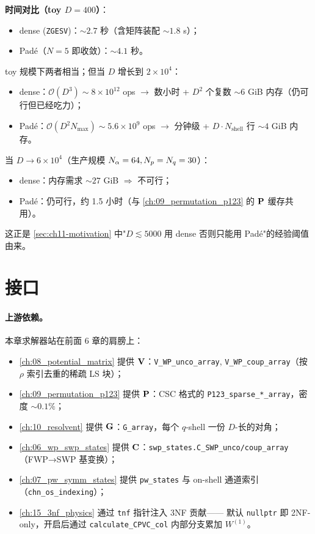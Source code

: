 \begin{numericalbox}
\medskip
\textbf{时间对比（toy \(D=400\)）}：
\begin{itemize}
  \item dense (\texttt{ZGESV})：\(\sim 2.7\) 秒（含矩阵装配 \(\sim 1.8\) s）；
  \item Padé（\(N=5\) 即收敛）：\(\sim 4.1\) 秒。
\end{itemize}
toy 规模下两者相当；但当 \(D\) 增长到 \(2 \times 10^4\)：
\begin{itemize}
  \item dense：\(\mathcal{O}(D^3) \sim 8 \times 10^{12}\) ops \(\to\) 数小时
        + \(D^2\) 个复数 \(\sim\!6\) GiB 内存（仍可行但已经吃力）；
  \item Padé：\(\mathcal{O}(D^2 N_{\max}) \sim 5.6 \times 10^9\) ops \(\to\) 分钟级
        + \(D \cdot N_{\text{shell}}\) 行 \(\sim\!4\) GiB 内存。
\end{itemize}
当 \(D \to 6 \times 10^4\)（生产规模 \(N_\alpha=64, N_p=N_q=30\)）：
\begin{itemize}
  \item dense：内存需求 \(\sim 27\) GiB \(\Rightarrow\) 不可行；
  \item Padé：仍可行，约 1.5 小时（与 \cref{ch:09_permutation_p123} 的 \(\mathbf{P}\) 缓存共用）。
\end{itemize}
这正是 \cref{sec:ch11-motivation} 中"\(D \lesssim 5000\) 用 dense
否则只能用 Padé"的经验阈值由来。
\end{numericalbox}

\section{接口}
\label{sec:ch11-interfaces}

\paragraph{上游依赖。}
本章求解器站在前面 6 章的肩膀上：
\begin{itemize}
  \item \cref{ch:08_potential_matrix} 提供 \(\mathbf{V}\)：\texttt{V\_WP\_unco\_array}, \texttt{V\_WP\_coup\_array}（按 \(\rho\) 索引去重的稀疏 LS 块）；
  \item \cref{ch:09_permutation_p123} 提供 \(\mathbf{P}\)：CSC 格式的 \texttt{P123\_sparse\_*\_array}，密度 \(\sim 0.1\%\)；
  \item \cref{ch:10_resolvent} 提供 \(\mathbf{G}\)：\texttt{G\_array}，每个 \(q\)-shell 一份 \(D\)-长的对角；
  \item \cref{ch:06_wp_swp_states} 提供 \(\mathbf{C}\)：\texttt{swp\_states.C\_SWP\_unco/coup\_array}（FWP→SWP 基变换）；
  \item \cref{ch:07_pw_symm_states} 提供 \texttt{pw\_states} 与 on-shell 通道索引（\texttt{chn\_os\_indexing}）；
  \item \cref{ch:15_3nf_physics} 通过 \texttt{tnf} 指针注入 3NF 贡献——
        默认 \texttt{nullptr} 即 2NF-only，开启后通过 \texttt{calculate\_CPVC\_col} 内部分支累加 \(W^{(1)}\)。
\end{itemize}

